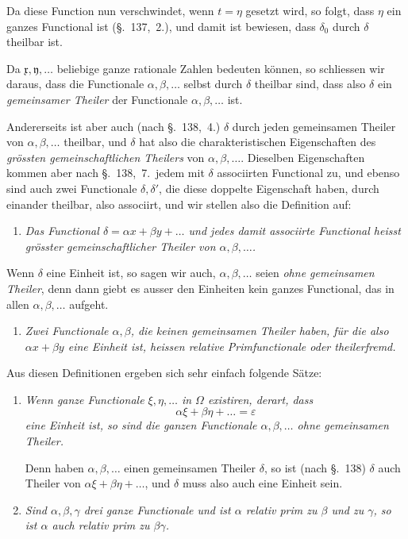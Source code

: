 \documentclass[12pt,a4paper]{article}
\theoremstyle{definition}
\begin{document}
Da diese Function nun verschwindet, wenn $t=\eta$ gesetzt wird, so folgt, dass $\eta$ ein ganzes Functional ist (\S.~137,~2.), und damit ist bewiesen, dass $\delta_0$ durch $\delta$ theilbar ist.

Da $\mathfrak{x},\mathfrak{y},\dots$ beliebige ganze rationale Zahlen bedeuten können, so schliessen wir daraus, dass die Functionale $\alpha,\beta,\dots$ selbst durch $\delta$ theilbar sind, dass also $\delta$ ein \emph{gemeinsamer Theiler} der Functionale $\alpha,\beta,\dots$ ist.

Andererseits ist aber auch (nach \S.~138,~4.) $\delta$ durch jeden gemeinsamen Theiler von $\alpha,\beta,\dots$ theilbar, und $\delta$ hat also die charakteristischen Eigenschaften des \emph{grössten gemeinschaftlichen Theilers} von $\alpha,\beta,\dots$. Dieselben Eigenschaften kommen aber nach \S.~138,~7.\ jedem mit $\delta$ associirten Functional zu, und ebenso sind auch zwei Functionale $\delta,\delta'$, die diese doppelte Eigenschaft haben, durch einander theilbar, also associirt, und wir stellen also die Definition auf:

\begin{enumerate}[label=\arabic*.]
\item \textit{Das Functional $\delta=\alpha x+\beta y+\dots$ und jedes damit associirte Functional heisst \emph{grösster gemeinschaftlicher Theiler} von $\alpha,\beta,\dots$.}
\end{enumerate}

Wenn $\delta$ eine Einheit ist, so sagen wir auch, $\alpha,\beta,\dots$ seien \emph{ohne gemeinsamen Theiler}, denn dann giebt es ausser den Einheiten kein ganzes Functional, das in allen $\alpha,\beta,\dots$ aufgeht.

\begin{enumerate}[label=\arabic*., resume]
\item \textit{Zwei Functionale $\alpha,\beta$, die keinen gemeinsamen Theiler haben, für die also $\alpha x+\beta y$ eine Einheit ist, heissen \emph{relative Primfunctionale} oder \emph{theilerfremd}.}
\end{enumerate}

Aus diesen Definitionen ergeben sich sehr einfach folgende Sätze:

\begin{enumerate}[label=\arabic*., resume]
\item \textit{Wenn ganze Functionale $\xi,\eta,\dots$ in $\Omega$ existiren, derart, dass}
\[
\alpha\xi + \beta\eta + \dots = \varepsilon
\]
\textit{eine Einheit ist, so sind die ganzen Functionale $\alpha,\beta,\dots$ ohne gemeinsamen Theiler.}

Denn haben $\alpha,\beta,\dots$ einen gemeinsamen Theiler $\delta$, so ist (nach \S.~138) $\delta$ auch Theiler von $\alpha\xi+\beta\eta+\dots$, und $\delta$ muss also auch eine Einheit sein.

\item \textit{Sind $\alpha,\beta,\gamma$ drei ganze Functionale und ist $\alpha$ relativ prim zu $\beta$ und zu $\gamma$, so ist $\alpha$ auch relativ prim zu $\beta\gamma$.}
\end{enumerate}
\end{document}
